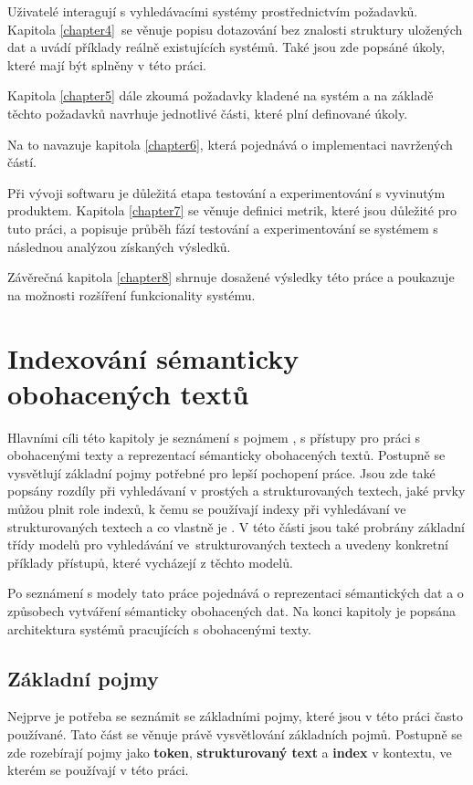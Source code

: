 Uživatelé  interagují s vyhledávacími systémy prostřednictvím požadavků. Kapitola \ref{chapter4}~se věnuje popisu dotazování bez znalosti struktury uložených dat a uvádí příklady reálně existujících systémů.  Také jsou zde popsáné úkoly, které mají být splněny v této práci.


Kapitola \ref{chapter5} dále zkoumá požadavky kladené na systém a na základě těchto požadavků navrhuje jednotlivé části, které plní definované úkoly. 
 
Na to navazuje kapitola \ref{chapter6}, která pojednává o implementaci navržených částí. 

Při vývoji softwaru je důležitá etapa testování a experimentování s vyvinutým produktem. Kapitola \ref{chapter7} se věnuje definici metrik, které jsou důležité pro tuto práci, a popisuje průběh fází testování a experimentování se systémem s následnou analýzou získaných výsledků.


Závěrečná kapitola \ref{chapter8} shrnuje dosažené výsledky této práce a poukazuje na možnosti rozšíření funkcionality systému. 

\chapter{Indexování sémanticky obohacených textů}
\label{chapter2}

Hlavními cíli této kapitoly je seznámení s pojmem , s přístupy pro práci s obohacenými texty a reprezentací sémanticky obohacených textů. Postupně se vysvětlují základní pojmy potřebné pro lepší pochopení práce. Jsou zde také popsány rozdíly při vyhledávaní v prostých a strukturovaných textech, jaké prvky můžou plnit role indexů, k čemu se používají indexy při vyhledávaní ve strukturovaných textech a co vlastně je . V této části jsou také probrány základní třídy modelů pro vyhledávání ve~strukturovaných textech a uvedeny konkretní příklady přístupů, které vycházejí z těchto modelů. 

Po seznámení s modely tato práce pojednává o  reprezentaci sémantických dat a o způsobech vytváření sémanticky obohacených dat. Na konci kapitoly je popsána architektura  systémů pracujících s obohacenými texty.   

\section{Základní pojmy}
Nejprve je potřeba se seznámit se základními pojmy, které jsou v této práci často používané. Tato část se věnuje právě vysvětlování základních pojmů. Postupně se zde rozebírají pojmy jako \textbf{token}, \textbf{strukturovaný text} a \textbf{index}  v kontextu, ve kterém se používají v této práci.

